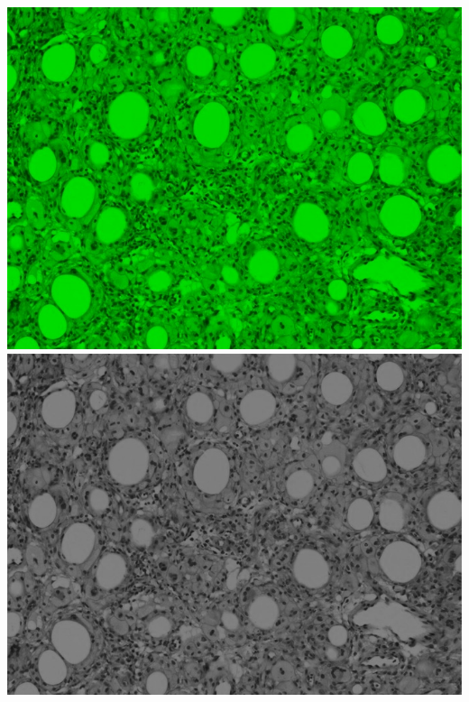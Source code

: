 \documentclass[a4paper]{article}
\begin{document}
\begin{minipage}{0.24\textwidth}
    \centering
    \includegraphics[width=\textwidth]{../code/task1/output/g_channel.jpg}
    \includegraphics[width=\textwidth]{../code/task1/output/g_channel_greyscale.jpg}
\end{minipage}
\hfill
\end{document}
